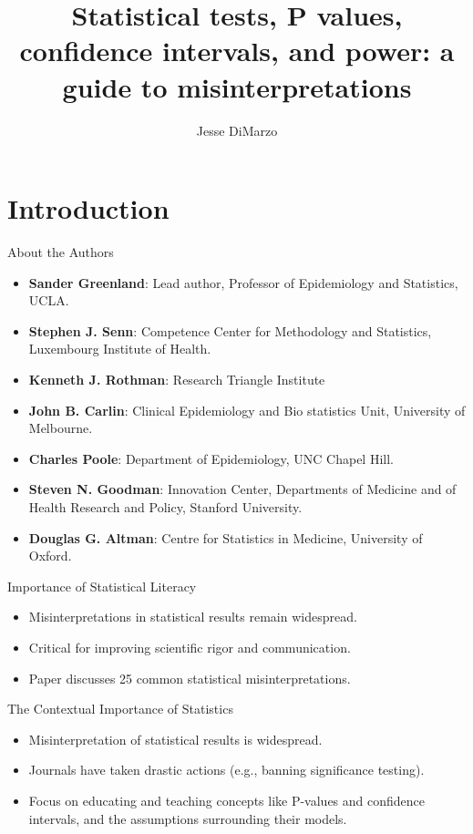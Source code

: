 \documentclass[aspectratio=169, 12pt]{beamer}
\title{Statistical tests, P values, confidence intervals, and power: a guide
to misinterpretations}
\author{Jesse DiMarzo}
\date{}
\begin{document}
 
\frame{\titlepage}

\section{Introduction}
\begin{frame}{About the Authors}
\begin{itemize}
    \item \textbf{Sander Greenland}: Lead author, Professor of Epidemiology and Statistics, UCLA.
    \item \textbf{Stephen J. Senn}: Competence Center for Methodology and Statistics, Luxembourg Institute of Health.
    \item \textbf{Kenneth J. Rothman}: Research Triangle Institute
    \item \textbf{John B. Carlin}: Clinical Epidemiology and Bio statistics Unit, University of Melbourne.
    \item \textbf{Charles Poole}: Department of Epidemiology, UNC Chapel Hill.
    \item \textbf{Steven N. Goodman}:  Innovation Center, Departments of Medicine
and of Health Research and Policy, Stanford University.
    \item \textbf{Douglas G. Altman}: Centre for Statistics in Medicine, University of Oxford.
\end{itemize}
\end{frame}
 

\begin{frame}{Importance of Statistical Literacy}
\begin{itemize}
    \item Misinterpretations in statistical results remain widespread.
    \vspace{0.5cm}
    \item Critical for improving scientific rigor and communication. 
    \vspace{0.5cm}
    \item Paper discusses 25 common statistical misinterpretations.
\end{itemize}
\end{frame}




\begin{frame}{The Contextual Importance of Statistics}
\begin{itemize}
    \item Misinterpretation of statistical results is widespread.
    \vspace{0.5cm}
    \item Journals have taken drastic actions (e.g., banning significance testing).
    \vspace{0.5cm}
    \item Focus on educating and teaching concepts like P-values and confidence intervals, and the assumptions surrounding their models.
\end{itemize}
\end{frame}
\end{document}
